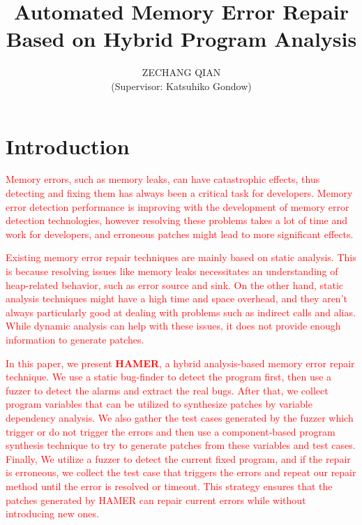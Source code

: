 \documentclass[twoside,twocolumn]{article}
\title{Automated Memory Error Repair Based on Hybrid Program Analysis} %
\author{ ZECHANG QIAN \\ (Supervisor:  Katsuhiko Gondow)}
\date{} %
\begin{document}
\maketitle


\section{Introduction}
\textcolor{red}{
Memory errors, such as memory leaks, can have catastrophic effects,  thus detecting and fixing them has always been a critical task for developers. Memory error detection performance is improving with the development of memory error detection technologies, however resolving these problems takes a lot of time and work for developers, and erroneous patches might lead to more significant effects.}

\textcolor{red}{
Existing memory error repair techniques\cite{SAVER,Memfix} are mainly based on static analysis. This is because resolving issues like memory leaks necessitates an understanding of heap-related behavior, such as error source and sink. On the other hand, static analysis techniques might have a high time and space overhead, and they aren't always particularly good at dealing with problems such as indirect calls and alias. While dynamic analysis can help with these issues, it does not provide enough information to generate patches.}

\textcolor{red}{
In this paper, we present \textbf{HAMER}, a hybrid analysis-based memory error repair technique. We use a static bug-finder to detect the program first, then use a fuzzer to detect the alarms and extract the real bugs. After that, we collect program variables that can be utilized to synthesize patches by variable dependency analysis. We also gather the test cases generated by the fuzzer which trigger or do not trigger the errors and then use a component-based program synthesis technique to try to generate patches from these variables and test cases. Finally, We utilize a fuzzer to detect the current fixed program, and if the repair is erroneous, we collect the test case that triggers the errors and repeat our repair method until the error is resolved or timeout. This strategy ensures that the patches generated by HAMER can repair current errors while without introducing new ones.}
\end{document}
